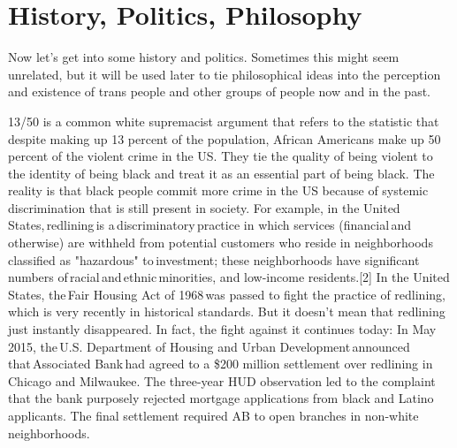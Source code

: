 \documentclass[12 pt, a4paper]{article}
\begin{document}
\section{History, Politics, Philosophy}

Now let's get into some history and politics. Sometimes this might seem unrelated, but it will be used later to tie philosophical ideas into the perception and existence of trans people and other groups of people now and in the past. 

13/50 is a common white supremacist argument that refers to the statistic that despite making up 13 percent of the population, African Americans make up 50 percent of the violent crime in the US. They tie the quality of being violent to the identity of being black and treat it as an essential part of being black. The reality is that black people commit more crime in the US because of systemic discrimination that is still present in society. For example, in the United States, redlining is a discriminatory practice in which services (financial and otherwise) are withheld from potential customers who reside in neighborhoods classified as "hazardous" to investment; these neighborhoods have significant numbers of racial and ethnic minorities, and low-income residents.[2] In the United States, the Fair Housing Act of 1968 was passed to fight the practice of redlining, which is very recently in historical standards. But it doesn't mean that redlining just instantly disappeared. In fact, the fight against it continues today: In May 2015, the U.S. Department of Housing and Urban Development announced that Associated Bank had agreed to a \$200 million settlement over redlining in Chicago and Milwaukee. The three-year HUD observation led to the complaint that the bank purposely rejected mortgage applications from black and Latino applicants. The final settlement required AB to open branches in non-white neighborhoods. 
\end{document}
